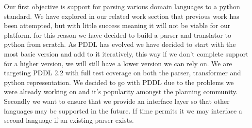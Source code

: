 Our first objective is support for parsing various domain languages to a python standard. We have explored in our related work section that previous work has been attempted, but with little success meaning it will not be viable for our platform. for this reason we have decided to build a parser and translator to python from scratch. As PDDL has evolved we have decided to start with the most basic version and add to it iteratively, this way if we don't complete support for a higher version, we will still have a lower version we can rely on. We are targeting PDDL 2.2 with full test coverage on both the parser, transformer and python representation. We decided to go with PDDL due to the problems we were already working on and it's popularity amongst the planning community. Secondly we want to ensure that we provide an interface layer so that other languages may be supported in the future. If time permits it we may interface a second language if an existing parser exists.

